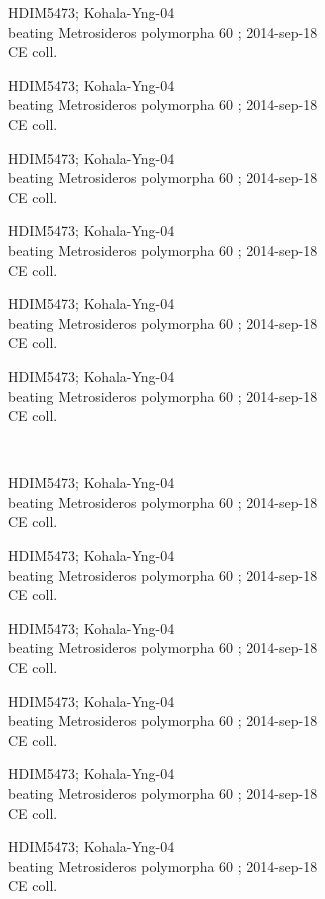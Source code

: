 \documentclass[2pt]{extarticle}
\begin{document}
\noindent
\parbox{0.16\textwidth}{\tiny \raggedright \rule[-0.3\baselineskip]{0pt}{10pt}HDIM5473; Kohala-Yng-04\\ beating Metrosideros polymorpha 60 ; 2014-sep-18\\ CE coll.}
\parbox{0.16\textwidth}{\tiny \raggedright \rule[-0.3\baselineskip]{0pt}{10pt}HDIM5473; Kohala-Yng-04\\ beating Metrosideros polymorpha 60 ; 2014-sep-18\\ CE coll.}
\parbox{0.16\textwidth}{\tiny \raggedright \rule[-0.3\baselineskip]{0pt}{10pt}HDIM5473; Kohala-Yng-04\\ beating Metrosideros polymorpha 60 ; 2014-sep-18\\ CE coll.}
\parbox{0.16\textwidth}{\tiny \raggedright \rule[-0.3\baselineskip]{0pt}{10pt}HDIM5473; Kohala-Yng-04\\ beating Metrosideros polymorpha 60 ; 2014-sep-18\\ CE coll.}
\parbox{0.16\textwidth}{\tiny \raggedright \rule[-0.3\baselineskip]{0pt}{10pt}HDIM5473; Kohala-Yng-04\\ beating Metrosideros polymorpha 60 ; 2014-sep-18\\ CE coll.}
\parbox{0.16\textwidth}{\tiny \raggedright \rule[-0.3\baselineskip]{0pt}{10pt}HDIM5473; Kohala-Yng-04\\ beating Metrosideros polymorpha 60 ; 2014-sep-18\\ CE coll.} \\ 
\vspace{0.001in} 

\noindent
\parbox{0.16\textwidth}{\tiny \raggedright \rule[-0.3\baselineskip]{0pt}{10pt}HDIM5473; Kohala-Yng-04\\ beating Metrosideros polymorpha 60 ; 2014-sep-18\\ CE coll.}
\parbox{0.16\textwidth}{\tiny \raggedright \rule[-0.3\baselineskip]{0pt}{10pt}HDIM5473; Kohala-Yng-04\\ beating Metrosideros polymorpha 60 ; 2014-sep-18\\ CE coll.}
\parbox{0.16\textwidth}{\tiny \raggedright \rule[-0.3\baselineskip]{0pt}{10pt}HDIM5473; Kohala-Yng-04\\ beating Metrosideros polymorpha 60 ; 2014-sep-18\\ CE coll.}
\parbox{0.16\textwidth}{\tiny \raggedright \rule[-0.3\baselineskip]{0pt}{10pt}HDIM5473; Kohala-Yng-04\\ beating Metrosideros polymorpha 60 ; 2014-sep-18\\ CE coll.}
\parbox{0.16\textwidth}{\tiny \raggedright \rule[-0.3\baselineskip]{0pt}{10pt}HDIM5473; Kohala-Yng-04\\ beating Metrosideros polymorpha 60 ; 2014-sep-18\\ CE coll.}
\parbox{0.16\textwidth}{\tiny \raggedright \rule[-0.3\baselineskip]{0pt}{10pt}HDIM5473; Kohala-Yng-04\\ beating Metrosideros polymorpha 60 ; 2014-sep-18\\ CE coll.} \\ 
\vspace{0.001in} 
\end{document}
